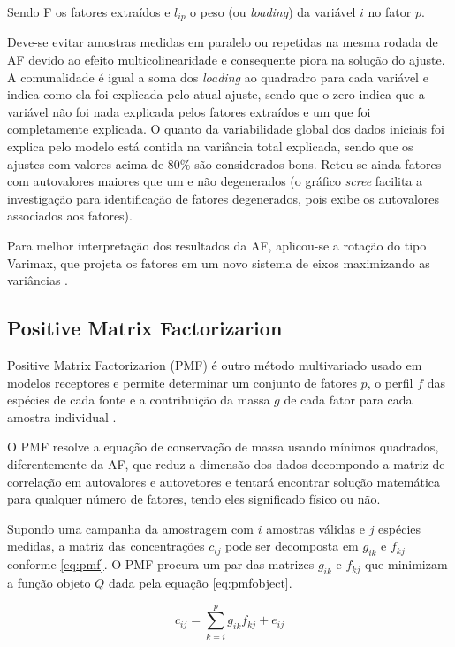 Sendo F os fatores extraídos e $l_{ip}$ o peso (ou \textit{loading})
da variável $i$ no fator $p$.

Deve-se evitar amostras medidas em paralelo ou repetidas na mesma rodada de AF 
devido ao efeito multicolinearidade e consequente piora na solução do ajuste.  
A comunalidade é igual a soma dos \textit{loading} ao quadradro 
para cada variável e indica como ela foi explicada pelo atual ajuste, 
sendo que o zero indica que a variável não foi nada explicada pelos fatores 
extraídos e um que foi completamente explicada. 
O quanto da variabilidade global dos dados iniciais foi explica pelo modelo está 
contida na variância total explicada, sendo que os ajustes com valores 
acima de 80\% são considerados bons. 
Reteu-se ainda fatores com autovalores maiores que um e não degenerados 
(o gráfico \textit{scree} facilita a investigação para identificação de fatores 
degenerados, pois exibe os autovalores associados aos fatores). 

Para melhor interpretação dos resultados da AF, aplicou-se a rotação do tipo 
Varimax, que projeta os fatores em um novo sistema de eixos maximizando 
as variâncias \citep{kaiser1958}.

\subsection{Positive Matrix Factorizarion}

Positive Matrix Factorizarion (PMF) é outro método multivariado usado
em modelos receptores e permite determinar um conjunto de fatores $p$, 
o perfil $f$ das espécies de cada fonte e a contribuição da massa $g$ 
de cada fator para cada amostra individual \citep{norris2014}. 

O PMF resolve a equação de conservação de massa usando mínimos 
quadrados, diferentemente da AF, que reduz a dimensão dos 
dados decompondo a matriz de correlação em autovalores e autovetores e 
tentará encontrar solução matemática para qualquer número de fatores, tendo
eles significado físico ou não. 

Supondo uma campanha da amostragem com $i$ amostras válidas e 
$j$ espécies medidas, a matriz das concentrações $c_{ij}$ 
pode ser decomposta em $g_{ik}$ e $f_{kj}$ conforme \ref{eq:pmf}. 
O PMF procura um par das matrizes $g_{ik}$ e $f_{kj}$ que
minimizam a função objeto $Q$ dada pela equação \ref{eq:pmfobject}. 

\begin{equation}
  c_{ij} = \sum_{k=i}^p g_{ik}f_{kj} + e_{ij}
  \label{eq:pmf}
\end{equation}

